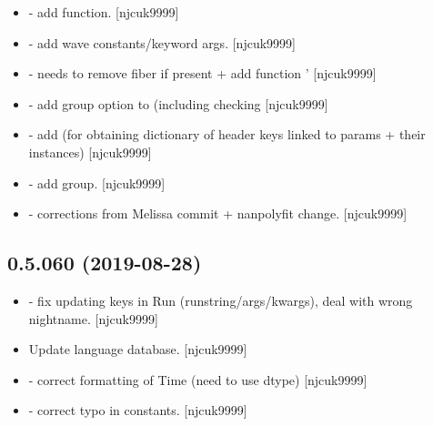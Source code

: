 \documentclass[a4paper,10pt,english]{report}
\begin{document}
\begin{itemize}
\item {} 
 - add  function.
{[}njcuk9999{]}

\item {} 
 - add wave constants/keyword args. {[}njcuk9999{]}

\item {} 
 -  needs to remove fiber
if present + add function ’ {[}njcuk9999{]}

\item {} 
 - add group option to 
(including checking  {[}njcuk9999{]}

\item {} 
 - add  (for
obtaining dictionary of header keys linked to params + their
instances) {[}njcuk9999{]}

\item {} 
 - add group. {[}njcuk9999{]}

\item {} 
 - corrections from Melissa commit + nanpolyfit
change. {[}njcuk9999{]}

\end{itemize}


\subsection{0.5.060 (2019-08-28)}
\label{\detokenize{misc/changelog:id82}}\begin{itemize}
\item {} 
 - fix updating keys in Run
(runstring/args/kwargs), deal with wrong nightname. {[}njcuk9999{]}

\item {} 
Update language database. {[}njcuk9999{]}

\item {} 
 - correct formatting of Time (need to use dtype)
{[}njcuk9999{]}

\item {} 
 - correct typo in
constants. {[}njcuk9999{]}

\end{itemize}
\end{document}
